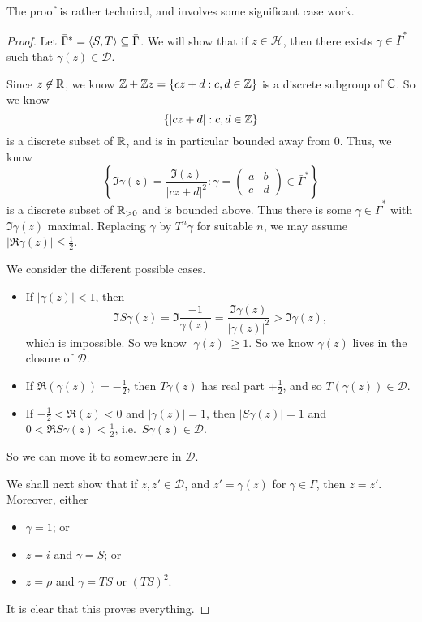 \documentclass[a4paper]{article}
\renewcommand{\H}{\mathcal{H}}
\begin{document}
The proof is rather technical, and involves some significant case work.
\begin{proof}
  Let $\bar{\Gamma}^* = \langle S, T\rangle \subseteq \bar{\Gamma}$. We will show that if $z \in \H$, then there exists $\gamma \in \bar\Gamma^*$ such that $\gamma(z) \in \mathcal{D}$.

  Since $z \not \in \mathbb{R}$, we know $\mathbb{Z} + \mathbb{Z} z = \{cz + d: c, d \in \mathbb{Z}\}$ is a discrete subgroup of $\mathbb{C}$. So we know
  \[
    \{|cz + d|: c, d \in \mathbb{Z}\}
  \]
  is a discrete subset of $\mathbb{R}$, and is in particular bounded away from $0$. Thus, we know
  \[
    \left\{\Im \gamma(z) = \frac{\Im (z)}{|cz + d|^2}: \gamma =
    \begin{pmatrix}
      a & b\\
      c & d
    \end{pmatrix} \in \bar\Gamma^*\right\}
  \]
  is a discrete subset of $\mathbb{R}_{>0}$ and is bounded above. Thus there is some $\gamma \in \bar{\Gamma}^*$ with $\Im \gamma(z)$ maximal. Replacing $\gamma$ by $T^n \gamma$ for suitable $n$, we may assume $|\Re \gamma(z)| \leq \frac{1}{2}$.

  We consider the different possible cases.
  \begin{itemize}
    \item If $|\gamma(z)| < 1$, then
      \[
        \Im S \gamma(z) = \Im \frac{-1}{\gamma(z)} = \frac{\Im \gamma(z)}{|\gamma(z)|^2} > \Im \gamma(z),
      \]
      which is impossible. So we know $|\gamma(z)| \geq 1$. So we know $\gamma(z)$ lives in the closure of $\mathcal{D}$.

    \item If $\Re(\gamma(z)) = -\frac{1}{2}$, then $T \gamma(z)$ has real part $+\frac{1}{2}$, and so $T(\gamma(z)) \in \mathcal{D}$.

    \item If $-\frac{1}{2} < \Re(z) < 0$ and $|\gamma(z)| = 1$, then $|S\gamma(z)| = 1$ and $0 < \Re S\gamma(z) < \frac{1}{2}$, i.e.\ $S \gamma(z) \in \mathcal{D}$.
  \end{itemize}
  So we can move it to somewhere in $\mathcal{D}$.

  \separator

  We shall next show that if $z, z' \in \mathcal{D}$, and $z' = \gamma(z)$ for $\gamma \in \bar{\Gamma}$, then $z = z'$. Moreover, either
  \begin{itemize}
    \item $\gamma = 1$; or
    \item $z = i$ and $\gamma = S$; or
    \item $z = \rho$ and $\gamma = TS$ or $(TS)^2$.
  \end{itemize}
  It is clear that this proves everything.


\end{proof}
\end{document}

